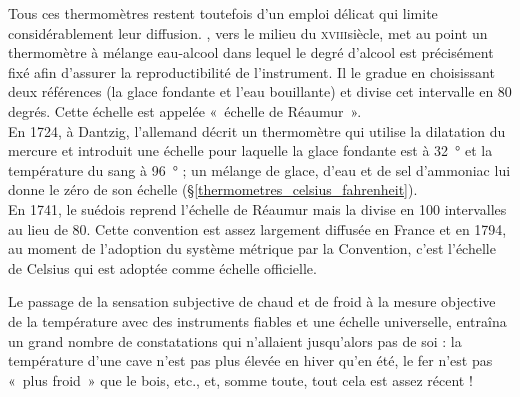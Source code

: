	Tous ces thermomètres restent toutefois d'un emploi délicat qui limite considérablement leur diffusion. , vers le milieu du \textsc{xviii}\ieme siècle, met au point un thermomètre à mélange eau-alcool dans lequel le degré d'alcool est précisément fixé afin d'assurer la reproductibilité de l'instrument. Il le gradue en choisissant deux références (la glace fondante et l'eau bouillante) et divise cet intervalle en 80 degrés. Cette échelle est appelée «~échelle de Réaumur~».\\	
	En 1724, à Dantzig, l’allemand  décrit un thermomètre qui utilise la dilatation du mercure et introduit une échelle pour laquelle la glace fondante est à \SI{32}{\degree} et la température du sang à \SI{96}{\degree} ; un mélange de glace, d'eau et de sel d'ammoniac lui donne le zéro de son échelle (\S\ref{thermometres_celsius_fahrenheit}).\\	
	En 1741, le suédois  reprend l'échelle de Réaumur mais la divise en 100 intervalles au lieu de 80. Cette convention est assez largement diffusée en France et en 1794, au moment de l'adoption du système métrique par la Convention, c'est l'échelle de Celsius qui est adoptée comme échelle officielle.

	Le passage de la sensation subjective de chaud et de froid à la mesure objective de la température avec des instruments fiables et une échelle universelle, entraîna un grand nombre de constatations qui n'allaient jusqu'alors pas de soi : la température d'une cave n'est pas plus élevée en hiver qu'en été, le fer n'est pas «~plus froid~» que le bois, etc., et, somme toute, tout cela est assez récent !

\atendofhistorysection
